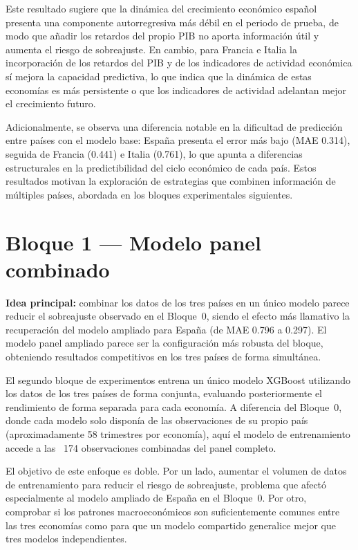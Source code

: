 Este resultado sugiere que la dinámica del crecimiento económico español presenta una componente autorregresiva más débil en el periodo de prueba, de modo que añadir los retardos del propio PIB no aporta información útil y aumenta el riesgo de sobreajuste. En cambio, para Francia e Italia la incorporación de los retardos del PIB y de los indicadores de actividad económica sí mejora la capacidad predictiva, lo que indica que la dinámica de estas economías es más persistente o que los indicadores de actividad adelantan mejor el crecimiento futuro.

Adicionalmente, se observa una diferencia notable en la dificultad de predicción entre países con el modelo base: España presenta el error más bajo (MAE 0.314), seguida de Francia (0.441) e Italia (0.761), lo que apunta a diferencias estructurales en la predictibilidad del ciclo económico de cada país. Estos resultados motivan la exploración de estrategias que combinen información de múltiples países, abordada en los bloques experimentales siguientes.

\FloatBarrier
\section{Bloque 1 --- Modelo panel combinado}

\textbf{Idea principal:} combinar los datos de los tres países en un único modelo parece reducir el sobreajuste observado en el Bloque~0, siendo el efecto más llamativo la recuperación del modelo ampliado para España (de MAE 0.796 a 0.297). El modelo panel ampliado parece ser la configuración más robusta del bloque, obteniendo resultados competitivos en los tres países de forma simultánea.

El segundo bloque de experimentos entrena un único modelo XGBoost utilizando los datos de los tres países de forma conjunta, evaluando posteriormente el rendimiento de forma separada para cada economía. A diferencia del Bloque~0, donde cada modelo solo disponía de las observaciones de su propio país (aproximadamente 58 trimestres por economía), aquí el modelo de entrenamiento accede a las ~174 observaciones combinadas del panel completo.

El objetivo de este enfoque es doble. Por un lado, aumentar el volumen de datos de entrenamiento para reducir el riesgo de sobreajuste, problema que afectó especialmente al modelo ampliado de España en el Bloque~0. Por otro, comprobar si los patrones macroeconómicos son suficientemente comunes entre las tres economías como para que un modelo compartido generalice mejor que tres modelos independientes.

